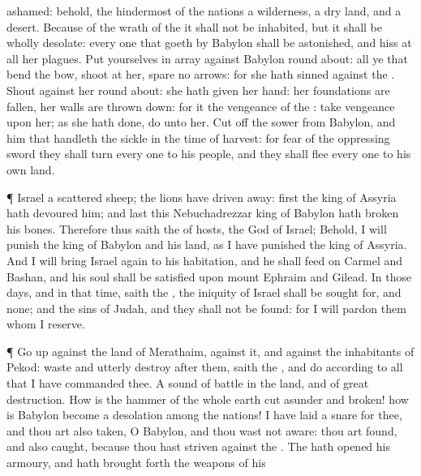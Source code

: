 {ashamed: behold, the
hindermost of the
nations
{} a
wilderness, a dry
land, and a
desert.
Because of the
wrath of the
{} it shall not be
inhabited, but it shall be wholly
desolate: every one that
goeth by
Babylon shall be
astonished, and
hiss at all her
plagues.
Put yourselves in
array against
Babylon round
about: all ye that
bend the
bow,
shoot at her,
spare no
arrows: for she hath
sinned against the
{}.
Shout against her round
about: she hath
given her
hand: her
foundations are
fallen, her
walls are thrown
down: for it
{} the
vengeance of the
{}: take
vengeance upon her; as she hath
done,
do unto her.
Cut
off the
sower from
Babylon, and him that
handleth the
sickle in the
time of
harvest: for
fear of the
oppressing
sword they shall
turn every
one to his
people, and they shall
flee every
one to his own
land.
\par }{\PP {}¶
Israel
{} a
scattered
sheep; the
lions have driven
{}
away:
first the
king of
Assyria hath
devoured him; and
last this
Nebuchadrezzar
king of
Babylon hath broken his
bones.
Therefore thus
saith the
{} of
hosts, the
God of
Israel; Behold, I will
punish the
king of
Babylon and his
land, as I have
punished the
king of
Assyria.
And I will
bring
Israel
again to his
habitation, and he shall
feed on
Carmel and
Bashan, and his
soul shall be
satisfied upon
mount
Ephraim and
Gilead.
In those
days, and in that
time,
saith the
{}, the
iniquity of
Israel shall be sought
for, and
{} none; and the
sins of
Judah, and they shall not be
found: for I will
pardon them whom I
reserve.
\par }{\PP {}¶ Go
up against the
land of
Merathaim,
{} against it, and against the
inhabitants of
Pekod:
waste and utterly
destroy
after them,
saith the
{}, and
do according to all that I have
commanded thee.
A
sound of
battle
{} in the
land, and of
great
destruction.
How is the
hammer of the whole
earth cut
asunder and
broken! how is
Babylon become a
desolation among the
nations!
I have laid a
snare for thee, and thou art also
taken, O
Babylon, and thou wast not
aware: thou art
found, and also
caught, because thou hast
striven against the
{}.
The
{} hath
opened his
armoury, and hath brought
forth the
weapons of his
}
